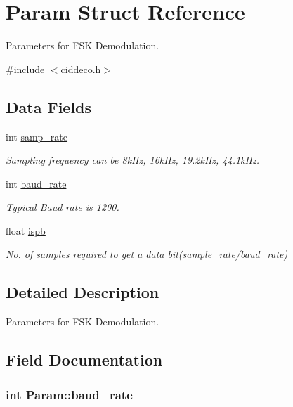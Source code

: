 \hypertarget{structParam}{}\section{Param Struct Reference}
\label{structParam}


Parameters for F\+S\+K Demodulation.  




{\ttfamily \#include $<$ciddeco.\+h$>$}

\subsection*{Data Fields}
\begin{DoxyCompactItemize}
\item 
int \hyperlink{structParam_acbb300a28b38ec5837beb40fa7c4f3b9}{samp\+\_\+rate}
\begin{DoxyCompactList}\small\item\em Sampling frequency can be 8k\+Hz, 16k\+Hz, 19.\+2k\+Hz, 44.\+1k\+Hz. \end{DoxyCompactList}\item 
int \hyperlink{structParam_ad0cbe314294d64048b457c7a7ad440fd}{baud\+\_\+rate}
\begin{DoxyCompactList}\small\item\em Typical Baud rate is 1200. \end{DoxyCompactList}\item 
float \hyperlink{structParam_a2c86a3473a2e28db9a42003e56e7fa23}{ispb}
\begin{DoxyCompactList}\small\item\em No. of samples required to get a data bit(sample\+\_\+rate/baud\+\_\+rate) \end{DoxyCompactList}\end{DoxyCompactItemize}


\subsection{Detailed Description}
Parameters for F\+S\+K Demodulation. 

\subsection{Field Documentation}
\hypertarget{structParam_ad0cbe314294d64048b457c7a7ad440fd}{}
\subsubsection[{baud\+\_\+rate}]{\setlength{\rightskip}{0pt plus 5cm}int Param\+::baud\+\_\+rate}\label{structParam_ad0cbe314294d64048b457c7a7ad440fd}


